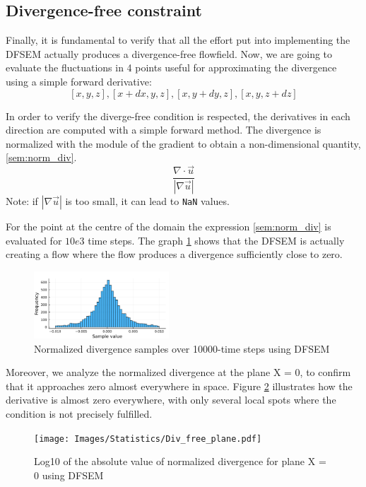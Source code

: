 \documentclass{juliacon}
\begin{document}
\subsection{Divergence-free constraint}
Finally, it is fundamental to verify that all the effort put into implementing the DFSEM actually produces a divergence-free flowfield. 
Now, we are going to evaluate the fluctuations in 4 points useful for approximating the divergence using a simple forward derivative:
$$[x,y,z], [x+dx, y, z], [x,y+dy,z], [x,y,z+dz]$$

In order to verify the diverge-free condition is respected, the derivatives in each direction are computed with a simple forward method.
The divergence is normalized with the module of the gradient to obtain a non-dimensional quantity, \eqref{sem:norm_div}.
\begin{equation}
    \dfrac{\nabla\cdot \vec{u}}{|\nabla \vec{u}|}
    \label{sem:norm_div}
\end{equation}
Note: if $|\nabla \Vec{u}|$ is too small, it can lead to \texttt{NaN} values.

For the point at the centre of the domain the expression \eqref{sem:norm_div} is evaluated for $10e3$ time steps. The graph \ref{figsem:zero_div} shows that the DFSEM is actually creating a flow where the flow produces a divergence sufficiently close to zero. 

\begin{figure}[h]
     \centering          
     \includegraphics[width=0.45\textwidth]{Images/Statistics/dfsem_zero_div.png}
         \caption{Normalized divergence samples over 10000-time steps using DFSEM}          
         \label{figsem:zero_div}
\end{figure} 

Moreover, we analyze the normalized divergence at the plane X = 0, to confirm that it approaches zero almost everywhere in space. Figure \ref{figsem:zero_div_plane} illustrates how the derivative is almost zero everywhere, with only several local spots where the condition is not precisely fulfilled.

\begin{figure}[h]
     \centering          
     \texttt{[image: Images/Statistics/Div\_free\_plane.pdf]}
         \caption{Log10 of the absolute value of normalized divergence for plane X = 0 using DFSEM}          
         \label{figsem:zero_div_plane}
\end{figure} 

 
 



\end{document}
